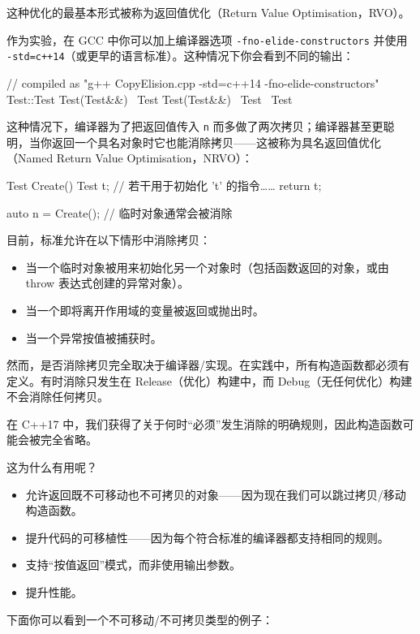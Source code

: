 这种优化的最基本形式被称为返回值优化（Return Value Optimisation，RVO）。

作为实验，在 GCC 中你可以加上编译器选项 \texttt{-fno-elide-constructors} 并使用 \texttt{-std=c++14}（或更早的语言标准）。这种情况下你会看到不同的输出：

\begin{codebox}
// compiled as "g++ CopyElision.cpp -std=c++14 -fno-elide-constructors"
Test::Test
Test(Test&&)
~Test
Test(Test&&)
~Test
~Test
\end{codebox}

这种情况下，编译器为了把返回值传入 \texttt{n} 而多做了两次拷贝；编译器甚至更聪明，当你返回一个具名对象时它也能消除拷贝——这被称为具名返回值优化（Named Return Value Optimisation，NRVO）：

\begin{codebox}[cpp]
Test Create()
{
    Test t;
    // 若干用于初始化 't' 的指令……
    return t;
}

auto n = Create(); // 临时对象通常会被消除
\end{codebox}

目前，标准允许在以下情形中消除拷贝：

\begin{itemize}
\item 当一个临时对象被用来初始化另一个对象时（包括函数返回的对象，或由 throw 表达式创建的异常对象）。
\item 当一个即将离开作用域的变量被返回或抛出时。
\item 当一个异常按值被捕获时。
\end{itemize}

然而，是否消除拷贝完全取决于编译器/实现。在实践中，所有构造函数都必须有定义。有时消除只发生在 Release（优化）构建中，而 Debug（无任何优化）构建不会消除任何拷贝。

在 C++17 中，我们获得了关于何时“必须”发生消除的明确规则，因此构造函数可能会被完全省略。

这为什么有用呢？

\begin{itemize}
\item 允许返回既不可移动也不可拷贝的对象——因为现在我们可以跳过拷贝/移动构造函数。
\item 提升代码的可移植性——因为每个符合标准的编译器都支持相同的规则。
\item 支持“按值返回”模式，而非使用输出参数。
\item 提升性能。
\end{itemize}

下面你可以看到一个不可移动/不可拷贝类型的例子：

